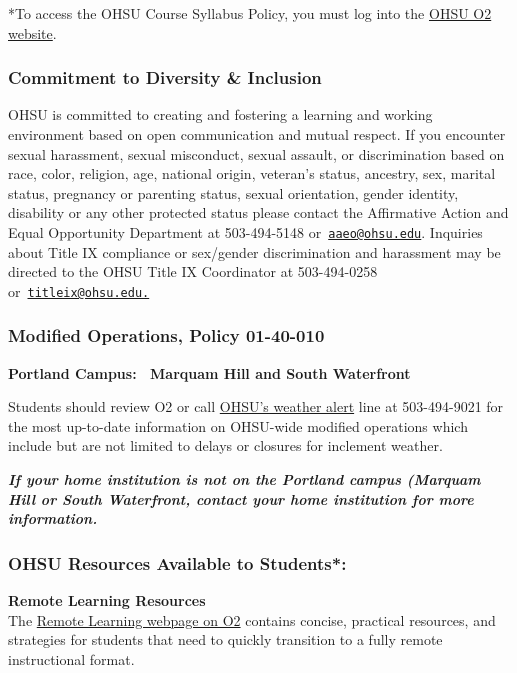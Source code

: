 \documentclass[
  letterpaper,
  DIV=11,
  numbers=noendperiod]{scrartcl}
\begin{document}
*To access the OHSU Course Syllabus Policy, you must log into the
\hyperref[0]{OHSU O2 website}.

\subsubsection{Commitment to Diversity \&
Inclusion}\label{commitment-to-diversity-inclusion}

OHSU is committed to creating and fostering a learning and working
environment based on open communication and mutual respect. If you
encounter sexual harassment, sexual misconduct, sexual assault, or
discrimination based on race, color, religion, age, national origin,
veteran's status, ancestry, sex, marital status, pregnancy or parenting
status, sexual orientation, gender identity, disability or any other
protected status please contact the Affirmative Action and Equal
Opportunity Department at 503-494-5148
or~\href{mailto:aaeo@ohsu.edu}{\nolinkurl{aaeo@ohsu.edu}}. Inquiries
about Title IX compliance or sex/gender discrimination and harassment
may be directed to the OHSU Title IX Coordinator at 503-494-0258
or~\href{mailto:titleix@ohsu.edu.}{\nolinkurl{titleix@ohsu.edu.}}

\subsubsection{Modified Operations, Policy
01-40-010}\label{modified-operations-policy-01-40-010}

\textbf{Portland Campus:~ Marquam Hill and South Waterfront}

Students should review O2 or call
\href{https://www.ohsu.edu/xd/about/visiting/weather/}{OHSU's weather
alert} line at 503-494-9021 for the most up-to-date information on
OHSU-wide modified operations which include but are not limited to
delays or closures for inclement weather.

\textbf{\emph{If your home institution is not on the Portland campus
(Marquam Hill or South Waterfront, contact your home institution for
more information.}}

\subsubsection{OHSU Resources Available to
Students*:}\label{ohsu-resources-available-to-students}

\textbf{Remote Learning Resources\\
}The
\href{https://o2.ohsu.edu/student-central/transforming-learning.cfm}{Remote
Learning webpage on O2} contains concise, practical resources, and
strategies for students that need to quickly transition to a fully
remote instructional format.
\end{document}
